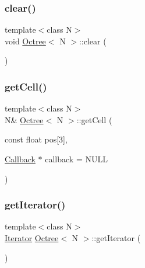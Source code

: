 \subsubsection{\texorpdfstring{clear()}{clear()}}
{\footnotesize\ttfamily template$<$class N$>$ \\
void \hyperlink{classOctree}{Octree}$<$ N $>$\+::clear (\begin{DoxyParamCaption}{ }\end{DoxyParamCaption})\hspace{0.3cm}{\ttfamily [inline]}}

\mbox{\label{classOctree_aeb0eeedf29f8c026ba53689def0c2f6b}} 
\subsubsection{\texorpdfstring{get\+Cell()}{getCell()}}
{\footnotesize\ttfamily template$<$class N$>$ \\
N\& \hyperlink{classOctree}{Octree}$<$ N $>$\+::get\+Cell (\begin{DoxyParamCaption}\item[{const float}]{pos\mbox{[}3\mbox{]},  }\item[{\hyperlink{classOctree_1_1Callback}{Callback} $\ast$}]{callback = {\ttfamily NULL} }\end{DoxyParamCaption})\hspace{0.3cm}{\ttfamily [inline]}}

\mbox{\label{classOctree_ad2974d58fadff0b043d6e8b1828b509c}} 
\subsubsection{\texorpdfstring{get\+Iterator()}{getIterator()}}
{\footnotesize\ttfamily template$<$class N$>$ \\
\hyperlink{classOctree_1_1Iterator}{Iterator} \hyperlink{classOctree}{Octree}$<$ N $>$\+::get\+Iterator (\begin{DoxyParamCaption}{ }\end{DoxyParamCaption})\hspace{0.3cm}{\ttfamily [inline]}}

\mbox{\label{classOctree_a13d22bffc1be63deb3557c230ac5e17e}} 
